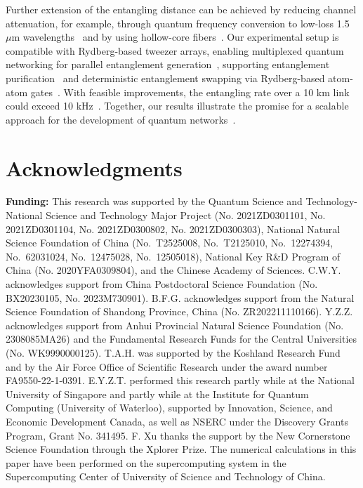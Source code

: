 \documentclass[aps,reprint,showpacs,superscriptaddress]{revtex4-2}
\begin{document}
Further extension of the entangling distance can be achieved by reducing channel attenuation, for example, through quantum frequency conversion to low-loss 1.5~$\mu$m wavelengths~\cite{ikuta2011wide,van2020long} and by using hollow-core fibers~\cite{petrovich2025broadband}. Our experimental setup is compatible with Rydberg-based tweezer arrays, enabling multiplexed quantum networking for parallel entanglement generation~\cite{hartung2024quantum,li2025parallelized}, supporting entanglement purification~\cite{Bennett96,pan_entanglement_2001,pan_experimental_2003,kalb2017entanglement} and deterministic entanglement swapping via Rydberg-based atom-atom gates~\cite{evered2023high}. With feasible improvements, the entangling rate over a 10 km link could exceed 10 kHz~\cite{SM}.
Together, our results illustrate the promise for a scalable approach for the development of quantum networks~\cite{azuma_quantum_2023}.

\section*{Acknowledgments}
\textbf{Funding:}
This research was supported by the Quantum Science and Technology-National Science and Technology Major Project (No. 2021ZD0301101, No. 2021ZD0301104, No. 2021ZD0300802, No. 2021ZD0300303), National Natural Science Foundation of China (No.~T2525008, No.~T2125010, No.~12274394, No.~62031024, No.~12475028, No.~12505018), National Key R\&D Program of China (No. 2020YFA0309804), and the Chinese Academy of Sciences. C.W.Y. acknowledges support from China Postdoctoral Science Foundation (No. BX20230105, No. 2023M730901). B.F.G. acknowledges support from the Natural Science Foundation of Shandong Province, China (No. ZR202211110166). Y.Z.Z. acknowledges support from Anhui Provincial Natural Science Foundation (No. 2308085MA26) and the Fundamental Research Funds for the Central Universities (No. WK9990000125). T.A.H. was supported by the Koshland Research Fund and by the Air Force Office of Scientific Research under the award number FA9550-22-1-0391. E.Y.Z.T. performed this research partly while at the National University of Singapore and partly while at the Institute for Quantum Computing (University of Waterloo), supported by Innovation, Science, and Economic Development Canada, as well as NSERC under the Discovery Grants Program, Grant No. 341495. F. Xu thanks the support by the New Cornerstone Science Foundation through the Xplorer Prize. The numerical calculations in this paper have been performed on the supercomputing system in the Supercomputing Center of University of Science and Technology of China.
\end{document}
